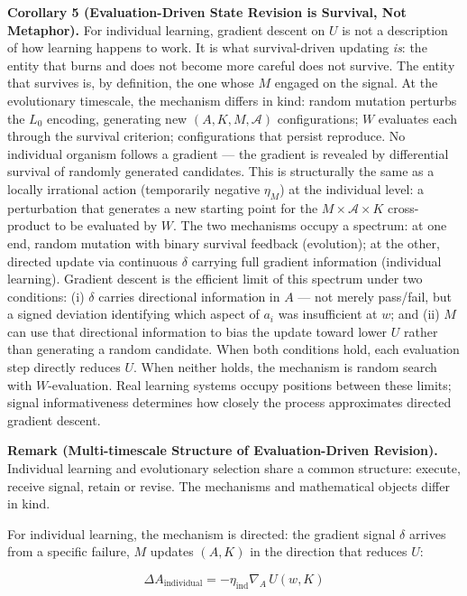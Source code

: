 \documentclass[
]{article}
\begin{document}
\textbf{Corollary 5 (Evaluation-Driven State Revision is Survival, Not
Metaphor).} For individual learning, gradient descent on \(U\) is not a
description of how learning happens to work. It is what survival-driven
updating \emph{is}: the entity that burns and does not become more
careful does not survive. The entity that survives is, by definition,
the one whose \(M\) engaged on the signal. At the evolutionary
timescale, the mechanism differs in kind: random mutation perturbs the
\(L_0\) encoding, generating new \((A, K, M, \mathcal{A})\)
configurations; \(W\) evaluates each through the survival criterion;
configurations that persist reproduce. No individual organism follows a
gradient --- the gradient is revealed by differential survival of
randomly generated candidates. This is structurally the same as a
locally irrational action (temporarily negative \(\eta_M\)) at the
individual level: a perturbation that generates a new starting point for
the \(M \times \mathcal{A} \times K\) cross-product to be evaluated by
\(W\). The two mechanisms occupy a spectrum: at one end, random mutation
with binary survival feedback (evolution); at the other, directed update
via continuous \(\delta\) carrying full gradient information (individual
learning). Gradient descent is the efficient limit of this spectrum
under two conditions: (i) \(\delta\) carries directional information in
\(A\) --- not merely pass/fail, but a signed deviation identifying which
aspect of \(a_i\) was insufficient at \(w\); and (ii) \(M\) can use that
directional information to bias the update toward lower \(U\) rather
than generating a random candidate. When both conditions hold, each
evaluation step directly reduces \(U\). When neither holds, the
mechanism is random search with \(W\)-evaluation. Real learning systems
occupy positions between these limits; signal informativeness determines
how closely the process approximates directed gradient descent.

\textbf{Remark (Multi-timescale Structure of Evaluation-Driven
Revision).} Individual learning and evolutionary selection share a
common structure: execute, receive signal, retain or revise. The
mechanisms and mathematical objects differ in kind.

For individual learning, the mechanism is directed: the gradient signal
\(\delta\) arrives from a specific failure, \(M\) updates \((A, K)\) in
the direction that reduces \(U\):

\[\Delta A_{\text{individual}} = -\eta_{\text{ind}} \nabla_A \, U(w, K)\]
\end{document}
